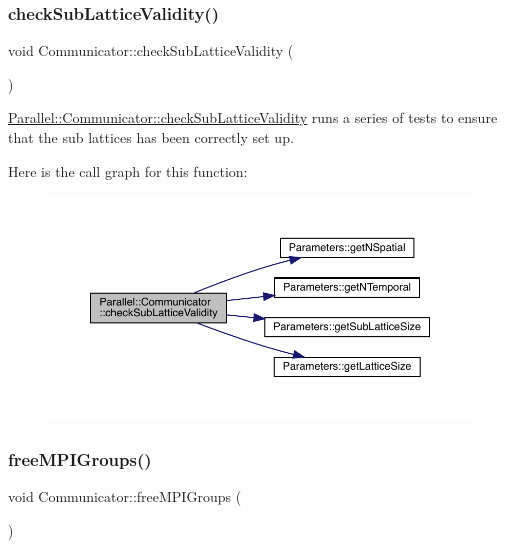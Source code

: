 \subsubsection{\texorpdfstring{checkSubLatticeValidity()}{checkSubLatticeValidity()}}
{\footnotesize\ttfamily void Communicator\+::check\+Sub\+Lattice\+Validity (\begin{DoxyParamCaption}{ }\end{DoxyParamCaption})\hspace{0.3cm}{\ttfamily [static]}}



\mbox{\hyperlink{class_parallel_1_1_communicator_a5da7239eefebcebbeeabee499b2d724d}{Parallel\+::\+Communicator\+::check\+Sub\+Lattice\+Validity}} runs a series of tests to ensure that the sub lattices has been correctly set up. 

Here is the call graph for this function\+:
\nopagebreak
\begin{figure}[H]
\begin{center}
\leavevmode
\includegraphics[width=350pt]{class_parallel_1_1_communicator_a5da7239eefebcebbeeabee499b2d724d_cgraph}
\end{center}
\end{figure}
\mbox{\label{class_parallel_1_1_communicator_aca0ac979aee1a649dbe5d4582b06a707}} 
\subsubsection{\texorpdfstring{freeMPIGroups()}{freeMPIGroups()}}
{\footnotesize\ttfamily void Communicator\+::free\+M\+P\+I\+Groups (\begin{DoxyParamCaption}{ }\end{DoxyParamCaption})\hspace{0.3cm}{\ttfamily [static]}}



